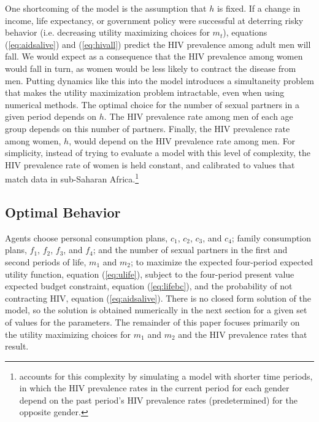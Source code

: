 \documentclass[12pt]{article}
\newcommand{\citee}[1]{\citet*{#1}}
\begin{document}
One shortcoming of the model is the assumption that $h$ is fixed.  If a change in income, life expectancy, or government policy were successful at deterring risky behavior (i.e. decreasing utility maximizing choices for $m_t$), equations (\ref{eq:aidsalive}) and (\ref{eq:hivall}) predict the HIV prevalence among adult men will fall.  We would expect as a consequence that the HIV prevalence among women would fall in turn, as women would be less likely to contract the disease from men. Putting dynamics like this into the model introduces a simultaneity problem that makes the utility maximization problem intractable, even when using numerical methods.  The optimal choice for the number of sexual partners in a given period depends on $h$.  The HIV prevalence rate among men of each age group depends on this number of partners.  Finally, the HIV prevalence rate among women, $h$, would depend on the HIV prevalence rate among men.  For simplicity, instead of trying to evaluate a model with this level of complexity, the HIV prevalence rate of women is held constant, and calibrated to values that match data in sub-Saharan Africa.\footnote{\citee{eoQJE} accounts for this complexity by simulating a model with shorter time periods, in which the HIV prevalence rates in the current period for each gender depend on the past period's HIV prevalence rates (predetermined) for the opposite gender.}

\subsection{Optimal Behavior}
Agents choose personal consumption plans, $c_1$, $c_2$, $c_3$, and $c_4$; family consumption plans, $f_1$, $f_2$, $f_3$, and $f_4$; and the number of sexual partners in the first and second periods of life, $m_1$ and $m_2$; to maximize the expected four-period expected utility function, equation (\ref{eq:ulife}), subject to the four-period present value expected budget constraint, equation (\ref{eq:lifebc}), and the probability of not contracting HIV, equation (\ref{eq:aidsalive}).  There is no closed form solution of the model, so the solution is obtained numerically in the next section for a given set of values for the parameters.  The remainder of this paper focuses primarily on the utility maximizing choices for $m_1$ and $m_2$ and the HIV prevalence rates that result.
\end{document}
